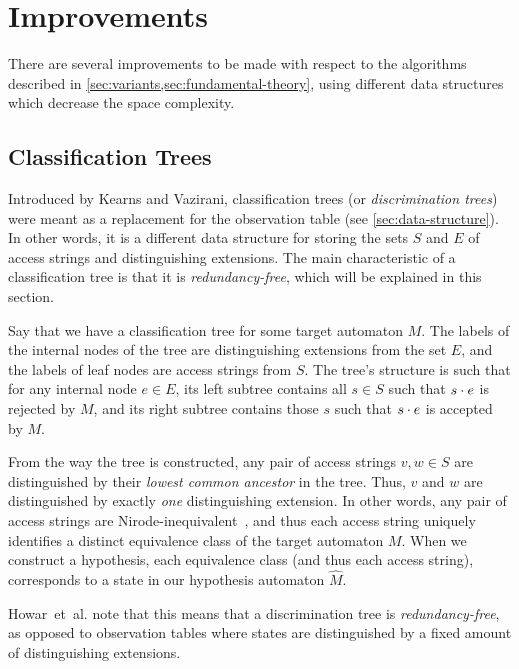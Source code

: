 \documentclass[multi,crop=false,class=article]{standalone}
\begin{document}
\section{Improvements}
\label{sec:improvements}
There are several improvements to be made with respect to the algorithms
described in \cref{sec:variants,sec:fundamental-theory}, using different data
structures which decrease the space complexity.

\subsection{Classification Trees}
\label{sec:classification-trees}
Introduced by Kearns and Vazirani\cite{Kearns94}, classification trees (or
\textit{discrimination trees}) were meant as a replacement for the observation
table (see \cref{sec:data-structure}). In other words, it is a different data
structure for storing the sets $S$ and $E$ of access strings and distinguishing
extensions. The main characteristic of a classification tree is that it is
\textit{redundancy-free}, which will be explained in this section.

Say that we have a classification tree for some target automaton $M$. The labels
of the internal nodes of the tree are distinguishing extensions from the set
$E$, and the labels of leaf nodes are access strings from $S$. The tree's
structure is such that for any internal node $e \in E$, its left subtree
contains all $s \in S$ such that $s \cdot e$ is rejected by $M$, and its right subtree
contains those $s$ such that $s \cdot e$ is accepted by $M$.

From the way the tree is constructed, any pair of access strings $v,w \in S$ are
distinguished by their \textit{lowest common ancestor} in the tree. Thus, $v$
and $w$ are distinguished by exactly \textit{one} distinguishing extension. In
other words, any pair of access strings are Nirode-inequivalent~, and thus each access string uniquely identifies a distinct
equivalence class of the target automaton $M$. When we construct a hypothesis,
each equivalence class (and thus each access string), corresponds to a state in
our hypothesis automaton $\hat M$.

Howar~et~al. note that this means that a discrimination tree is
\textit{redundancy-free}, as opposed to observation tables where states are
distinguished by a fixed amount of distinguishing extensions\cite{Howar14}.
\end{document}
